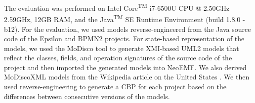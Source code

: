 \documentclass{llncs}
\begin{document}

The evaluation was performed on Intel\textsuperscript{\textregistered} Core\textsuperscript{TM} i7-6500U CPU @ 2.50GHz 2.59GHz, 12GB RAM, and the Java\textsuperscript{TM} SE Runtime Environment (build 1.8.0 -b12). For the evaluation, we used models reverse-engineered from the Java source code of the Epsilon \cite{eclipse2017epsilon,eclipse2018epsilongit} and BPMN2 \cite{eclipse2017bpmn2} projects. For state-based representation of the models, we used the MoDisco tool \cite{DBLP:journals/infsof/BruneliereCDM14} to generate XMI-based UML2 \cite{eclipse2017uml2} models that reflect the classes, fields, and operation signatures of the source code of the project and then imported the generated models into NeoEMF. We also derived MoDiscoXML models \cite{eclipse2018modiscoxml} from the Wikipedia article on the United States \cite{wikipedia2018us}. We then used reverse-engineering to generate a CBP for each project based on the differences between consecutive versions of the models.
\end{document}
